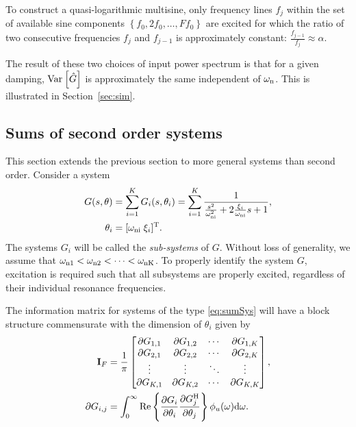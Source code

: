 To construct a quasi-logarithmic multisine, only frequency lines $f_j$ within the set of available sine components $\left\{f_0, 2 f_0, \ldots, F f_0  \right\}$ are excited for which the ratio of two consecutive frequencies $f_j$ and $f_{j-1}$ is approximately constant: $\frac{f_{j-1}}{f_j} \approx \alpha$.

The result of these two choices of input power spectrum is that for a given damping, $\var{\hat{G}}$ is approximately the same independent of $\wn$. 
This is illustrated in Section~\ref{sec:sim}.

\subsection{Sums of second order systems}
This section extends the previous section to more general systems than second order.
Consider a system
\begin{align}
G(s,\theta) &= \sum_{i=1}^{K} G_i(s,\theta_i)
             =\sum_{i=1}^{K}  \frac{1}
                                   {   \frac{s^2}{\wn[i]^2}
                                    + 2\frac{\damping_i}{\wn[i]}s
                                    + 1},\\
\theta_i&=[\wn[i]\;\damping_i]^{\T}.
\label{eq:sumSys}
\end{align}
The systems  $G_i$ will be called the \emph{sub-systems} of $G$. 
Without loss of generality, we assume that $\wn[1] < \wn[2] < \cdots < \wn[K]$. 
To properly identify the system $G$, excitation is required such that all subsystems are properly excited, regardless of their individual resonance frequencies.

The information matrix for systems of the type \eqref{eq:sumSys} will have a block structure commensurate with the dimension of $\theta_i$ given by
\begin{align}
\IF &= \frac{1}{\pi}
\begin{bmatrix}
  \partial G_{1,1}        &\partial G_{1,2}       &\cdots         &\partial G_{1,K}\\
  \partial G_{2,1}        &\partial G_{2,2}       &\cdots         &\partial G_{2,K}\\
  \vdots                  &\vdots                 &\ddots         &\vdots          \\
  \partial G_{K,1}        &\partial G_{K,2}       &\cdots         &\partial G_{K,K}
\end{bmatrix},\\
\partial G_{i,j} &= \int_0^\infty
                      \mathrm{Re}\left\{
                          \frac{\partial G_i}
                               {\partial \theta_i}
                          \frac{\partial G_j^{\HT}}
                               {\partial \theta_j}
                                \right\}
                      \phi_u(\omega)\dd\omega.
\end{align}

